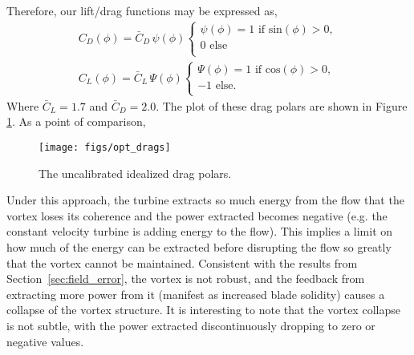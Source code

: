Therefore, our lift/drag functions may be expressed as,
\begin{align*} 
 C_D(\phi) = \bar C_D \, \psi(\phi) 
  \begin{cases}
   \psi(\phi) = 1 \text{ if sin}(\phi) > 0,   \\
   0 \text{ else} \\
  \end{cases} \\
 C_L(\phi) = \bar C_L \, \Psi(\phi) 
  \begin{cases}
   \Psi(\phi) = 1 \text{ if cos}(\phi) > 0,   \\
   -1 \text{ else}. \\
  \end{cases}
\end{align*}
Where $\bar C_L = 1.7$ and $\bar C_D = 2.0$. The plot of these drag
polars are shown in Figure \ref{drags}. As a point of comparison,  

\begin{figure}[!htb]
  \begin{center}
    \texttt{[image: figs/opt\_drags]}
    \caption{The uncalibrated idealized drag polars.} 
    \label{drags}
  \end{center}
\end{figure}


Under this approach, the turbine extracts so much energy from the flow
that the vortex loses its coherence and the power extracted becomes
negative (e.g. the constant velocity turbine is adding energy to the
flow).
This implies a limit on how much of the energy can be extracted before
disrupting the flow so greatly that the vortex cannot be maintained.   
Consistent with the results from Section~\ref{sec:field_error},
the vortex is not robust, and the feedback from extracting more power
from it (manifest as increased blade solidity) causes a collapse of the
vortex structure. It is interesting to note that the vortex collapse is
not subtle, with the power extracted discontinuously dropping to zero or
negative values. 

